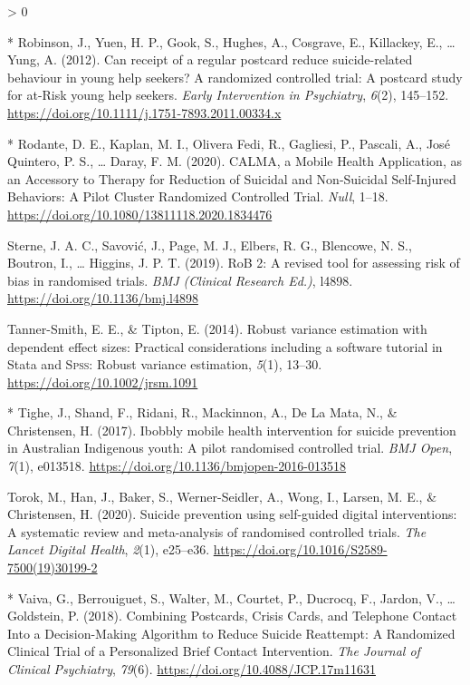 \documentclass[
  english,
  man]{apa6}
\newlength{\cslhangindent}
\newenvironment{CSLReferences}[2] %
 {%
  \setlength{\parindent}{0pt}
  \ifodd #1 \everypar{\setlength{\hangindent}{\cslhangindent}}\ignorespaces\fi
  \ifnum #2 > 0
  \setlength{\parskip}{#2\baselineskip}
  \fi
 }%
 {}
\begin{document}
\begin{CSLReferences}{1}{0}
\leavevmode\hypertarget{ref-robinson2012}{}%
* Robinson, J., Yuen, H. P., Gook, S., Hughes, A., Cosgrave, E., Killackey, E., \ldots{} Yung, A. (2012). Can receipt of a regular postcard reduce suicide-related behaviour in young help seekers? {A} randomized controlled trial: {A} postcard study for at-{Risk} young help seekers. \emph{Early Intervention in Psychiatry}, \emph{6}(2), 145--152. \url{https://doi.org/10.1111/j.1751-7893.2011.00334.x}

\leavevmode\hypertarget{ref-rodante2020}{}%
* Rodante, D. E., Kaplan, M. I., Olivera Fedi, R., Gagliesi, P., Pascali, A., José Quintero, P. S., \ldots{} Daray, F. M. (2020). {CALMA}, a {Mobile Health Application}, as an {Accessory} to {Therapy} for {Reduction} of {Suicidal} and {Non-Suicidal Self-Injured Behaviors}: {A Pilot Cluster Randomized Controlled Trial}. \emph{Null}, 1--18. \url{https://doi.org/10.1080/13811118.2020.1834476}

\leavevmode\hypertarget{ref-sterne2019}{}%
Sterne, J. A. C., Savović, J., Page, M. J., Elbers, R. G., Blencowe, N. S., Boutron, I., \ldots{} Higgins, J. P. T. (2019). {RoB} 2: {A} revised tool for assessing risk of bias in randomised trials. \emph{BMJ (Clinical Research Ed.)}, l4898. \url{https://doi.org/10.1136/bmj.l4898}

\leavevmode\hypertarget{ref-tanner-smith2014}{}%
Tanner-Smith, E. E., \& Tipton, E. (2014). Robust variance estimation with dependent effect sizes: {Practical} considerations including a software tutorial in {Stata} and {\textsc{Spss}}: {Robust} variance estimation, \emph{5}(1), 13--30. \url{https://doi.org/10.1002/jrsm.1091}

\leavevmode\hypertarget{ref-tighe2017}{}%
* Tighe, J., Shand, F., Ridani, R., Mackinnon, A., De La Mata, N., \& Christensen, H. (2017). Ibobbly mobile health intervention for suicide prevention in {Australian Indigenous} youth: {A} pilot randomised controlled trial. \emph{BMJ Open}, \emph{7}(1), e013518. \url{https://doi.org/10.1136/bmjopen-2016-013518}

\leavevmode\hypertarget{ref-torok2020}{}%
Torok, M., Han, J., Baker, S., Werner-Seidler, A., Wong, I., Larsen, M. E., \& Christensen, H. (2020). Suicide prevention using self-guided digital interventions: {A} systematic review and meta-analysis of randomised controlled trials. \emph{The Lancet Digital Health}, \emph{2}(1), e25--e36. \url{https://doi.org/10.1016/S2589-7500(19)30199-2}

\leavevmode\hypertarget{ref-vaiva2018}{}%
* Vaiva, G., Berrouiguet, S., Walter, M., Courtet, P., Ducrocq, F., Jardon, V., \ldots{} Goldstein, P. (2018). Combining {Postcards}, {Crisis Cards}, and {Telephone Contact Into} a {Decision-Making Algorithm} to {Reduce Suicide Reattempt}: {A Randomized Clinical Trial} of a {Personalized Brief Contact Intervention}. \emph{The Journal of Clinical Psychiatry}, \emph{79}(6). \url{https://doi.org/10.4088/JCP.17m11631}


\end{CSLReferences}
\end{document}
